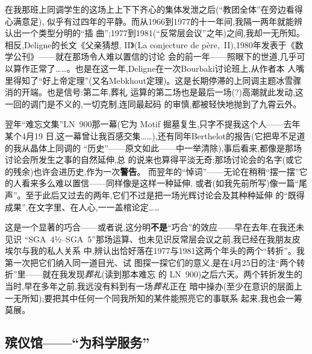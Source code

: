 在我那班上同调学生的这场上上下下齐心的集体发泄之后(“教团全体”在旁边看得心满意足),
似乎有过四年的平静。而从1966到1977的十一年间,我隔一两年就能辨认出一个类型分明的“插
曲”;1977到1981(“反常层会议”之年)之间,我却一无所知。相反,Deligne的长文《父亲猜想,
II》(La conjecture de père,~II),1980年发表于《数学公刊》——就在那场令人难以置信的讨论
会的前一年——照眼下的世道,几乎可以算作正常了……。也是在这一年,Deligne在一次Bourbaki讨论班上,从作者本
人嘴里得知了“好上帝定理”(又名Mebkhout定理)。这是长期停滞的上同调主题冰雪骤消的开端。也是信号:第二年,葬礼
运算的第二场也是最后一场(?)高潮就此发动,这一回的调门是不义的,一切克制,连同最起码
的审慎,都被轻快地抛到了九霄云外。

翌年“难忘文集”LN~900那一幕(它为 Motif 掘墓复生,只字不提我这个人——去年某个4月19
日,这一幕曾让我百感交集……),还有同年Berthelot的报告(它把卑不足道的我从晶体上同调的
“历史”——原文如此——中一举清除),事后看来,都像是\dmark{}那场讨论会所发生之事的自然延伸,总
的说来也算得平淡无奇;那场讨论会的名字(或它的残余)也许会进历史,作为一次\textbf{警告}。
而翌年的“悼词”——无论在稍稍“摆一摆”它的人看来多么难以置信——同样像是这样一种延伸,
或者(如我先前所写)像一篇“尾声”。至于此后又过去的两年,它们不过是把一场光辉讨论会及其种种延伸
的“既得成果”,在文字里、在人心,一一盖棺论定……

这是一个显著的巧合——或者说,这分明\textbf{不是}“巧合”的效应——早在去年,在我还未见识
“SGA~4½--SGA~5”那场运算、也未见识反常层会议之前,我已经在我朋友皮埃尔与我的私人关系
中,辨认出恰好落在1977与1981这两个年头的两个“转折”。我第一次把它们纳入同一道目光、试
图探一探它们的意义,是在4月25日的注“两个转折”里——就在我发现\emph{葬礼}(读到那本难忘
的 LN~900)之后六天。两个转折发生的当时,早在多年之前,我远没有料到有一场\emph{葬礼}正在
暗中操办(至少在意识的层面上一无所知);要把其中任何一个同我所知的某件能照亮它的事联系
起来,我也会一筹莫展。

\subsection{殡仪馆——“为科学服务”}   %

